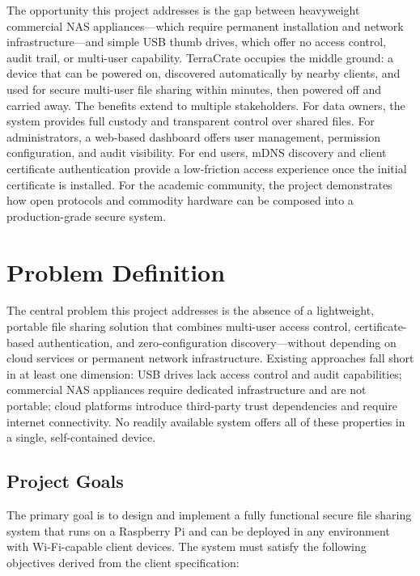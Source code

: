 \documentclass[12pt,letterpaper]{report}
\begin{document}
The opportunity this project addresses is the gap between heavyweight commercial NAS appliances---which require permanent installation and network infrastructure---and simple USB thumb drives, which offer no access control, audit trail, or multi-user capability. TerraCrate occupies the middle ground: a device that can be powered on, discovered automatically by nearby clients, and used for secure multi-user file sharing within minutes, then powered off and carried away. The benefits extend to multiple stakeholders. For data owners, the system provides full custody and transparent control over shared files. For administrators, a web-based dashboard offers user management, permission configuration, and audit visibility. For end users, mDNS discovery and client certificate authentication provide a low-friction access experience once the initial certificate is installed. For the academic community, the project demonstrates how open protocols and commodity hardware can be composed into a production-grade secure system.

\chapter{Problem Definition}

The central problem this project addresses is the absence of a lightweight, portable file sharing solution that combines multi-user access control, certificate-based authentication, and zero-configuration discovery---without depending on cloud services or permanent network infrastructure. Existing approaches fall short in at least one dimension: USB drives lack access control and audit capabilities; commercial NAS appliances require dedicated infrastructure and are not portable; cloud platforms introduce third-party trust dependencies and require internet connectivity. No readily available system offers all of these properties in a single, self-contained device.

\section{Project Goals}

The primary goal is to design and implement a fully functional secure file sharing system that runs on a Raspberry Pi and can be deployed in any environment with Wi-Fi-capable client devices. The system must satisfy the following objectives derived from the client specification:
\end{document}
